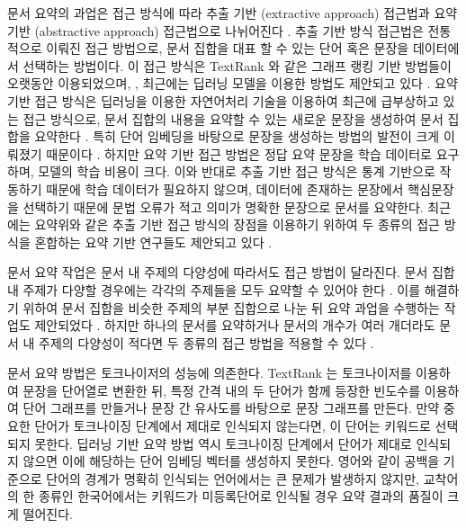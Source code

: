 \documentclass[11pt]{article}
\begin{document}
문서 요약의 과업은 접근 방식에 따라 추출 기반 (extractive approach) 접근법과 요약 기반 (abstractive approach) 접근법으로 나뉘어진다 \citep{yao2017recent}.
추출 기반 방식 접근법은 전통적으로 이뤄진 접근 방법으로, 문서 집합을 대표 할 수 있는 단어 혹은 문장을 데이터에서 선택하는 방법이다.
이 접근 방식은 TextRank \citep{mihalcea2004textrank} 와 같은 그래프 랭킹 기반 방법들이 오랫동안 이용되었으며,  \citep{parveen2015topical, narayan2018ranking}, 최근에는 딥러닝 모델을 이용한 방법도 제안되고 있다 \citep{rush2015neural}.
요약 기반 접근 방식은 딥러닝을 이용한 자연어처리 기술을 이용하여 최근에 급부상하고 있는 접근 방식으로, 문서 집합의 내용을 요약할 수 있는 새로운 문장을 생성하여 문서 집합을 요약한다 \citep{nallapati2016abstractive}.
특히 단어 임베딩을 바탕으로 문장을 생성하는 방법의 발전이 크게 이뤄졌기 때문이다 \citep{bengio2003neural, donahue2015long, xu2015show, nallapati2016abstractive}.
하지만 요약 기반 접근 방법은 정답 요약 문장을 학습 데이터로 요구하며, 모델의 학습 비용이 크다.
이와 반대로 추출 기반 접근 방식은 통계 기반으로 작동하기 때문에 학습 데이터가 필요하지 않으며, 데이터에 존재하는 문장에서 핵심문장을 선택하기 때문에 문법 오류가 적고 의미가 명확한 문장으로 문서를 요약한다.
최근에는 요약위와 같은 추출 기반 접근 방식의 장점을 이용하기 위하여 두 종류의 접근 방식을 혼합하는 요약 기반 연구들도 제안되고 있다 \citep{banerjee2015multi, bing2015abstractive, gu2016incorporating}.

문서 요약 작업은 문서 내 주제의 다양성에 따라서도 접근 방법이 달라진다.
문서 집합 내 주제가 다양할 경우에는 각각의 주제들을 모두 요약할 수 있어야 한다 \citep{yao2017recent}.
이를 해결하기 위하여 문서 집합을 비슷한 주제의 부분 집합으로 나눈 뒤 요약 과업을 수행하는 작업도 제안되었다 \citep{filippova2008sentence, filippova2010multi}.
하지만 하나의 문서를 요약하거나 문서의 개수가 여러 개더라도 문서 내 주제의 다양성이 적다면 두 종류의 접근 방법을 적용할 수 있다 \citep{goldstein2000multi, lin2002single}.

문서 요약 방법은 토크나이저의 성능에 의존한다.
TextRank 는 토크나이저를 이용하여 문장을 단어열로 변환한 뒤, 특정 간격 내의 두 단어가 함께 등장한 빈도수를 이용하여 단어 그래프를 만들거나 문장 간 유사도를 바탕으로 문장 그래프를 만든다.
만약 중요한 단어가 토크나이징 단계에서 제대로 인식되지 않는다면, 이 단어는 키워드로 선택되지 못한다.
딥러닝 기반 요약 방법 역시 토크나이징 단계에서 단어가 제대로 인식되지 않으면 이에 해당하는 단어 임베딩 벡터를 생성하지 못한다.
영어와 같이 공백을 기준으로 단어의 경계가 명확히 인식되는 언어에서는 큰 문제가 발생하지 않지만, 교착어의 한 종류인 한국어에서는 키워드가 미등록단어로 인식될 경우 요약 결과의 품질이 크게 떨어진다.
\end{document}

